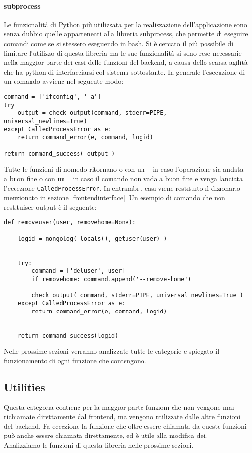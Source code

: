 \documentclass[11pt]{article}
\begin{document}
\paragraph{subprocess}\label{subprocess}
Le funzionalità di Python più utilizzata per la realizzazione dell'applicazione sono senza dubbio quelle appartenenti alla libreria subprocess,
che permette di eseguire comandi come se si stessero eseguendo in bash. Si è cercato il più possibile di limitare l'utilizzo di questa libreria
ma le sue funzionalità si sono rese necessarie nella maggior parte dei casi delle funzioni del backend,
a causa dello scarsa agilità che ha python di interfacciarsi col sistema sottostante.
In generale l'esecuzione di un comando avviene nel seguente modo:
\begin{lstlisting}
command = ['ifconfig', '-a']
try:
	output = check_output(command, stderr=PIPE, universal_newlines=True)
except CalledProcessError as e:
	return command_error(e, command, logid)

return command_success( output )
\end{lstlisting}
Tutte le funzioni di nomodo ritornano o con un \texttt{ } in caso l'operazione sia andata a buon fine
o con un \texttt{  } in caso il comando non vada a buon fine e venga lanciata l'eccezione \texttt{CalledProcessError}.
In entrambi i casi viene restituito il dizionario menzionato in sezione \ref{frontendinterface}.
Un esempio di comando che non restituisce output è il seguente:
\begin{lstlisting}
def removeuser(user, removehome=None):
        
    logid = mongolog( locals(), getuser(user) )
    

    try:
        command = ['deluser', user]
        if removehome: command.append('--remove-home') 

        check_output( command, stderr=PIPE, universal_newlines=True )
    except CalledProcessError as e:
        return command_error(e, command, logid)
    
    
    return command_success(logid)
\end{lstlisting}
Nelle prossime sezioni verranno analizzate tutte le categorie e spiegato il funzionamento di ogni funzione che contengono.

\subsection{Utilities}\label{utilities}
Questa categoria contiene per la maggior parte funzioni che non vengono mai richiamate direttamente dal frontend, ma vengono utilizzate
dalle altre funzioni del backend. Fa eccezione la funzione  che oltre essere chiamata da queste funzioni può anche
essere chiamata direttamente, ed è utile alla modifica dei. \\
Analizziamo le funzioni di questa libreria nelle prossime sezioni.
\end{document}
